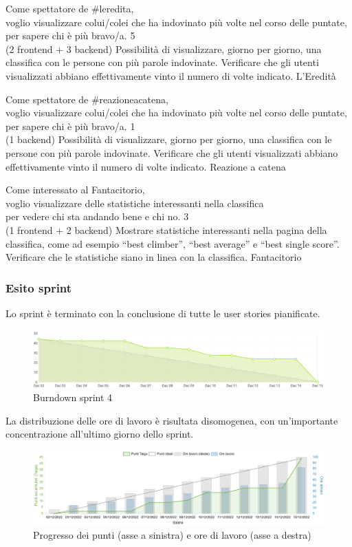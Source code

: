 \userstory%
{Come spettatore de \#leredita,\\voglio visualizzare colui/colei che ha indovinato più volte nel corso delle puntate,\\per sapere chi è più bravo/a.}%
{5\\(2 frontend + 3 backend)}%
{Possibilità di visualizzare, giorno per giorno, una classifica con le persone con più parole indovinate.}%
{Verificare che gli utenti visualizzati abbiano effettivamente vinto il numero di volte indicato.}
{L'Eredità}

\userstory%
{Come spettatore de \#reazioneacatena,\\voglio visualizzare colui/colei che ha indovinato più volte nel corso delle puntate,\\per sapere chi è più bravo/a.}%
{1\\(1 backend)}%
{Possibilità di visualizzare, giorno per giorno, una classifica con le persone con più parole indovinate.}%
{Verificare che gli utenti visualizzati abbiano effettivamente vinto il numero di volte indicato.}
{Reazione a catena}

\userstory%
{Come interessato al Fantacitorio,\\voglio visualizzare delle statistiche interessanti nella classifica\\per vedere chi sta andando bene e chi no.}%
{3\\(1 frontend + 2 backend)}%
{Mostrare statistiche interessanti nella pagina della classifica, come ad esempio “best climber”, “best average” e “best single score”.}%
{Verificare che le statistiche siano in linea con la classifica.}
{Fantacitorio}


\subsubsection{Esito sprint}
Lo sprint è terminato con la conclusione di tutte le user stories pianificate.\\
\begin{figure}[H]
    \centering
    \includegraphics[width=15cm]{./img/sprint4/burndown.png}
    \caption{Burndown sprint 4}
\end{figure}
La distribuzione delle ore di lavoro è risultata disomogenea, con un'importante concentrazione all'ultimo giorno dello sprint.
\begin{figure}[H]
    \centering
    \includegraphics[width=15cm]{./img/sprint4/worktime.png}
    \caption{Progresso dei punti (asse a sinistra) e ore di lavoro (asse a destra)}
\end{figure}


